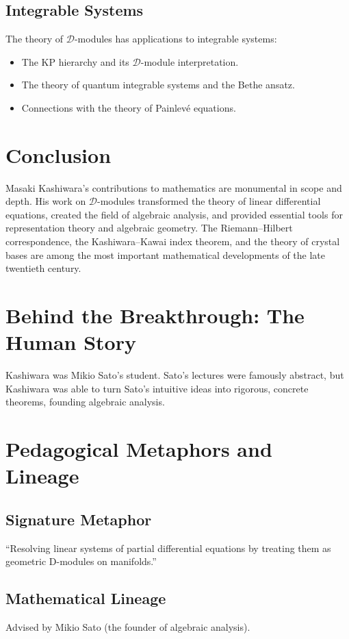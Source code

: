 \subsection{Integrable Systems}

The theory of $\mathcal{D}$-modules has applications to integrable systems:
\begin{itemize}
\item The KP hierarchy and its $\mathcal{D}$-module interpretation.
\item The theory of quantum integrable systems and the Bethe ansatz.
\item Connections with the theory of Painlev\'e equations.
\end{itemize}

\section{Conclusion}

Masaki Kashiwara's contributions to mathematics are monumental in scope and depth. His work on $\mathcal{D}$-modules transformed the theory of linear differential equations, created the field of algebraic analysis, and provided essential tools for representation theory and algebraic geometry. The Riemann--Hilbert correspondence, the Kashiwara--Kawai index theorem, and the theory of crystal bases are among the most important mathematical developments of the late twentieth century.


\section{Behind the Breakthrough: The Human Story}
Kashiwara was Mikio Sato's student. Sato's lectures were famously abstract, but Kashiwara was able to turn Sato's intuitive ideas into rigorous, concrete theorems, founding algebraic analysis.

\section{Pedagogical Metaphors and Lineage}
\subsection{Signature Metaphor}
``Resolving linear systems of partial differential equations by treating them as geometric D-modules on manifolds.''

\subsection{Mathematical Lineage}
Advised by Mikio Sato (the founder of algebraic analysis).

